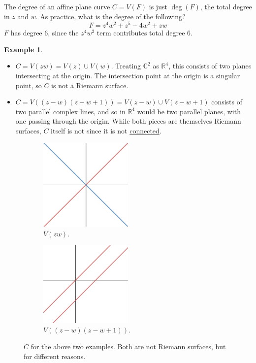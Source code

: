 \documentclass[12pt]{article}
\newcommand{\cx}{\mathbb{C}}
\newcommand{\real}{\mathbb{R}}
\theoremstyle{definition}
\newtheorem{example}[theorem]{Example}
\theoremstyle{remark}
\begin{document}
The degree of an affine plane curve $C=V(F)$ is just $\deg(F)$, the total degree in $z$ and $w$. As practice, what is the degree of the following?
\begin{equation}
    F=z^4w^2+z^5-4w^2+zw
\end{equation}
$F$ has degree 6, since the $z^4w^2$ term contributes total degree 6. 
\begin{example}
    \noindent
    \begin{itemize}
        \item $C=V(zw)=V(z)\cup V(w)$. Treating $\cx^2$ as $\real^4$, this consists of two planes intersecting at the origin. The intersection point at the origin is a singular point, so $C$ is not a Riemann surface.
        \item $C=V((z-w)(z-w+1))=V(z-w)\cup V(z-w+1)$ consists of two parallel complex lines, and so in $\real^4$ would be two parallel planes, with one passing through the origin. While both pieces are themselves Riemann surfaces, $C$ itself is not since it is not \underline{connected}.
    \end{itemize}
    \begin{figure}[H]
        \begin{subfigure}{0.5\textwidth}
            \centering
            \includegraphics[width=0.5\textwidth]{7.png}
            \caption{$V(zw)$.}
            \label{fig:subim1}
        \end{subfigure}
        \begin{subfigure}{0.5\textwidth}
            \centering
            \includegraphics[width=0.5\textwidth]{8.png}
            \caption{$V((z-w)(z-w+1))$.}
            \label{fig:subim2}
        \end{subfigure}
        \caption{$C$ for the above two examples. Both are not Riemann surfaces, but for different reasons.}
        \label{fig:my_label}
    \end{figure}
\end{example}
\end{document}
